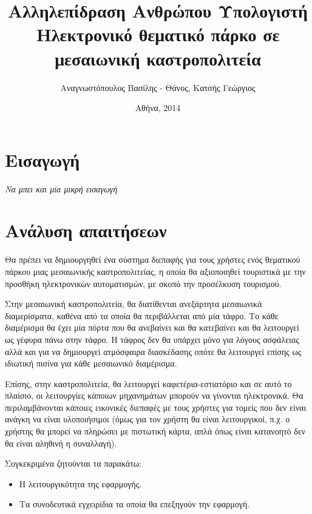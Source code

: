 \documentclass{assignment}
\title{Αλληλεπίδραση Ανθρώπου Υπολογιστή \\ Ηλεκτρονικό θεματικό πάρκο σε μεσαιωνική καστροπολιτεία}
\date{Αθήνα, 2014}
\author{Αναγνωστόπουλος Βασίλης - Θάνος, Κατσής Γεώργιος}
\begin{document}
\maketitle

\setcounter{page}{1} 

\pagestyle{plain}
\tableofcontents
\newpage


\pagestyle{fancy}
\setcounter{page}{1} 

\section{Εισαγωγή}
\emph{Να μπει και μία μικρή εισαγωγή}

\section{Ανάλυση απαιτήσεων}

Θα πρέπει να δημιουργηθεί ένα σύστημα διεπαφής για τους χρήστες ενός θεματικού πάρκου μιας μεσαιωνικής καστροπολιτείας, η οποία θα αξιοποιηθεί τουριστικά με την προσθήκη ηλεκτρονικών αυτοματισμών, με σκοπό την προσέλκυση τουρισμού.

Στην μεσαιωνική καστροπολιτεία, θα διατίθενται ανεξάρτητα μεσαιωνικά διαμερίσματα, καθένα από τα οποία θα περιβάλλεται από μία τάφρο. Το κάθε διαμέρισμα θα έχει μία πόρτα που θα ανεβαίνει και θα κατεβαίνει και θα λειτουργεί ως γέφυρα πάνω στην τάφρο. Η τάφρος δεν θα υπάρχει μόνο για λόγους ασφάλειας αλλά και για να δημιουργεί ατμόσφαιρα διασκέδασης οπότε θα λειτουργεί επίσης ως ιδιωτική πισίνα για κάθε μεσαιωνικό διαμέρισμα.

Επίσης, στην καστροπολιτεία, θα λειτουργεί καφετέρια-εστιατόριο και σε αυτό το πλαίσιο, οι λειτουργίες κάποιων μηχανημάτων μπορούν να γίνονται ηλεκτρονικά. Θα περιλαμβάνονται κάποιες εικονικές διεπαφές με τους χρήστες για τομείς που δεν είναι ανάγκη να είναι υλοποιήσιμοι (όμως για τον χρήστη θα είναι λειτουργικοί, π.χ. ο χρήστης θα μπορεί να πληρώσει με πιστωτική κάρτα, απλά όπως είναι κατανοητό δεν θα είναι αληθινή η συναλλαγή).  

Συγκεκριμένα ζητούνται τα παρακάτω:

\begin{itemize}
\item Η λειτουργικότητα της εφαρμογής.
\item Τα συνοδευτικά εγχειρίδια τα οποία θα επεξηγούν την εφαρμογή.
\end{itemize}
\end{document}
